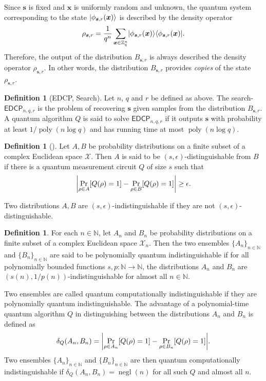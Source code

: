 \documentclass[11pt]{article}
\theoremstyle{plain}
\theoremstyle{definition}
\newtheorem{definition}[theorem]{Definition}
\DeclareMathOperator{\negl}{negl} %
\DeclareMathOperator{\poly}{poly}
\DeclarePairedDelimiter{\abs}{\lvert}{\rvert}
\DeclarePairedDelimiter{\ket}{\lvert}{\rangle}
\DeclarePairedDelimiter{\bra}{\langle}{\rvert}
\def\N{\ensuremath{\mathbb{N}}}
\def\Z{\ensuremath{\mathbb{Z}}}
\def\edcp{\ensuremath{\mathsf{EDCP}}}
\begin{document}
Since $\bm{s}$ is fixed and $\bm{x}$ is uniformly random and unknown, the quantum system corresponding to the state $\ket{\phi_{\bm{s}, r}(\bm{x})}$ is described by the density operator
\[ \rho_{\bm{s}, r} = \frac{1}{q^n} \sum_{\bm{x} \in \Z_q^n} \ket{\phi_{\bm{s}, r}(\bm{x})} \bra{\phi_{\bm{s}, r}(\bm{x})}. \]
Therefore, the output of the distribution $B_{\bm{s}, r}$ is always described the density operator $\rho_{\bm{s}, r}$. In other words, the distribution $B_{\bm{s}, r}$ provides \textit{copies} of the state $\rho_{\bm{s}, r}$.
\begin{definition}[EDCP, Search]
    Let $n$, $q$ and $r$ be defined as above. The search-$\edcp_{n, q, r}$ is the problem of recovering $\bm{s}$ given samples from the distribution $B_{\bm{s}, r}$. A quantum algorithm $Q$ is said to solve $\edcp_{n, q, r}$ if it outputs $\bm{s}$ with probability at least $1 / \poly(n\log q)$ and has running time at most $\poly(n\log q)$.
\end{definition}
\begin{definition}[\cite{watrous2009zero}]
    Let $A, B$ be probability distributions on a finite subset of a complex Euclidean space $\mathcal{X}$. Then $A$ is said to be $(s, \epsilon)$-distinguishable from $B$ if there is a quantum measurement circuit $Q$ of size $s$ such that
    \[ \abs*{ \Pr_{\rho \in A}[Q(\rho) = 1] - \Pr_{\rho \in B}[Q(\rho) = 1] } \ge \epsilon. \]
\end{definition} 
Two distributions $A, B$ are $(s, \epsilon)$-indistinguishable if they are not $(s, \epsilon)$-distinguishable.
\begin{definition}
    For each $n \in \N$, let $A_n$ and $B_n$ be probability distributions on a finite subset of a complex Euclidean space $\mathcal{X}_n$. Then the two ensembles $\{ A_n \}_{n \in \N}$ and $\{ B_n \}_{n \in \N}$ are said to be polynomially quantum indistinguishable if for all polynomially bounded functions $s, p: \N \rightarrow \N$, the distributions $A_n$ and $B_n$ are $(s(n), 1 / p(n))$-indistinguishable for almost all $n \in \N$.
\end{definition}
Two ensembles are called quantum computationally indistinguishable if they are polynomially quantum indistinguishable. The advantage of a polynomial-time quantum algorithm $Q$ in distinguishing between the distributions $A_n$ and $B_n$ is defined as
\[ \delta_Q(A_n, B_n) = \abs*{ \Pr_{\rho \in A_n}[Q(\rho) = 1] - \Pr_{\rho \in B_n}[Q(\rho) = 1] }. \]
Two ensembles $\{ A_n \}_{n \in \N}$ and $\{ B_n \}_{n \in \N}$ are then quantum computationally indistinguishable if $\delta_Q(A_n, B_n) = \negl(n)$ for all such $Q$ and almost all $n$. 
\end{document}
